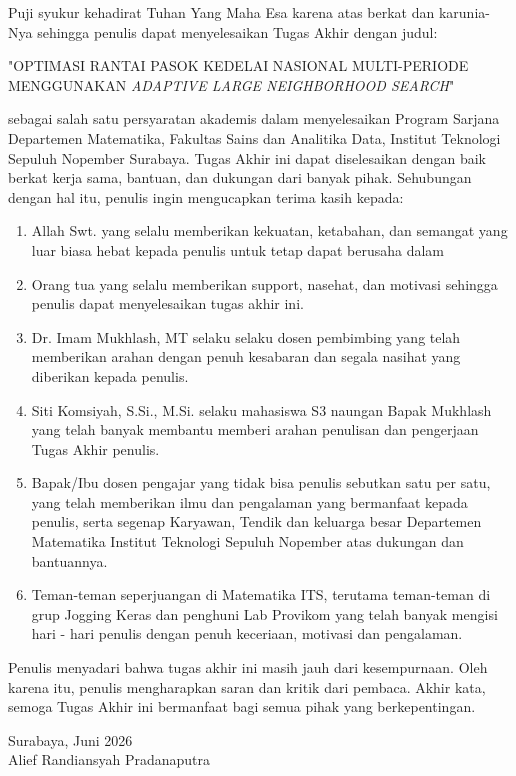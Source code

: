 \documentclass{file/TA-ITS}
\theoremstyle{definition}
\theoremstyle{definition}
\theoremstyle{plain}
\begin{document}
\KataPengantar
Puji syukur kehadirat Tuhan Yang Maha Esa karena atas berkat dan karunia-Nya
sehingga penulis dapat menyelesaikan Tugas Akhir dengan judul:
\begin{center}
    "OPTIMASI RANTAI PASOK KEDELAI NASIONAL MULTI-PERIODE MENGGUNAKAN \textit{ADAPTIVE LARGE NEIGHBORHOOD SEARCH}"
\end{center}
sebagai salah satu persyaratan akademis dalam menyelesaikan Program Sarjana Departemen Matematika, Fakultas Sains dan Analitika Data, Institut Teknologi Sepuluh Nopember Surabaya. Tugas Akhir ini dapat diselesaikan dengan baik berkat kerja sama, bantuan, dan dukungan dari banyak pihak. Sehubungan dengan hal itu, penulis ingin mengucapkan terima kasih kepada:
\begin{enumerate}
    \item Allah Swt. yang selalu memberikan kekuatan, ketabahan, dan semangat yang luar biasa hebat kepada penulis untuk tetap dapat berusaha dalam
    \item Orang tua yang selalu memberikan support, nasehat, dan motivasi sehingga penulis dapat menyelesaikan tugas akhir ini.
    \item Dr. Imam Mukhlash, MT selaku selaku dosen pembimbing yang telah memberikan arahan dengan penuh kesabaran dan segala nasihat yang diberikan kepada penulis.
    \item Siti Komsiyah, S.Si., M.Si. selaku mahasiswa S3 naungan Bapak Mukhlash yang telah banyak membantu memberi arahan penulisan dan pengerjaan Tugas Akhir penulis.
    \item Bapak/Ibu dosen pengajar yang tidak bisa penulis sebutkan satu per satu, yang telah memberikan ilmu dan pengalaman yang bermanfaat kepada penulis, serta segenap Karyawan, Tendik dan keluarga besar Departemen Matematika Institut Teknologi Sepuluh Nopember atas dukungan dan bantuannya.
    \item Teman-teman seperjuangan di Matematika ITS, terutama teman-teman di grup Jogging Keras dan penghuni Lab Provikom yang telah banyak mengisi hari - hari penulis dengan penuh keceriaan, motivasi dan pengalaman.
\end{enumerate}
Penulis menyadari bahwa tugas akhir ini masih jauh dari kesempurnaan. Oleh karena itu, penulis mengharapkan saran dan kritik dari pembaca. Akhir kata, semoga Tugas Akhir ini bermanfaat bagi semua pihak yang berkepentingan.

\begin{flushright}
Surabaya, Juni 2026
\\[2cm]
Alief Randiansyah Pradanaputra
\end{flushright}
\end{document}
